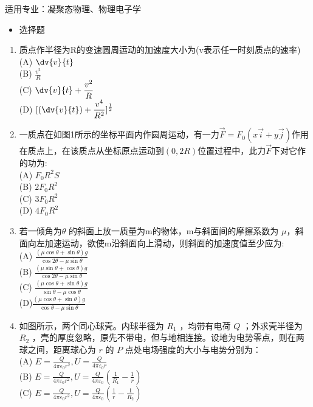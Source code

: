 适用专业：凝聚态物理、物理电子学
\begin{itemize}
\item 选择题
\end{itemize}
\begin{enumerate}
\item 质点作半径为R的变速圆周运动的加速度大小为(v表示任一时刻质点的速率)\\
(A) $\displaystyle \dv{v}{t}$\\
(B) $\displaystyle \frac{v^2}{R}$\\
(C) $\displaystyle \dv{v}{t}+\frac{v^2}{R}$\\
(D) $\displaystyle [(\dv{v}{t})+\frac{v^4}{R^2}]^\frac{1}{2}$
\item 一质点在如图1所示的坐标平面内作圆周运动，有一力$\vec F=F_0(x\vec i+y \vec j)$作用在质点上，在该质点从坐标原点运动到$(0,2R)$位置过程中，此力$\vec F$下对它作的功为:\\
(A) $F_0R^2S$\\
(B) $2F_0R^2$\\
(C) $3F_0R^2$\\
(D) $4F_0R^2$
\item 若一倾角为$\theta$ 的斜面上放一质量为m的物体，m与斜面间的摩擦系数为 $\mu$，斜面向左加速运动，欲使m沿斜面向上滑动，则斜面的加速度值至少应为:\\
(A) $\displaystyle \frac{(\mu \cos \theta+\sin \theta)g}{\cos 2\theta -\mu \sin \theta}$\\
(B) $\displaystyle\frac{(\mu \sin \theta+\cos \theta)g}{\cos 2\theta -\mu \sin \theta}$\\
(C) $\displaystyle \frac{(\mu \cos \theta+\sin \theta)g}{\sin \theta -\mu \cos\theta}$\\
(D)$\displaystyle \frac{(\mu \cos \theta+\sin \theta)g}{\cos \theta -\mu \sin\theta}$
\item 如图所示，两个同心球壳。内球半径为 $R_1$ ，均带有电荷 $Q$ ；外求壳半径为 $R_2$ ，壳的厚度忽略，原先不带电，但与地相连接。设地为电势零点，则在两球之间，距离球心为 $r$ 的 $P$ 点处电场强度的大小与电势分别为：\\
(A) $\displaystyle E=\frac{Q}{4\pi\varepsilon_0 r^2},U=\frac{Q}{4\pi\varepsilon_0 r}$\\
(B) $\displaystyle E=\frac{Q}{4\pi\varepsilon_0 r^2},U=\frac{Q}{4\pi\varepsilon_0} (\frac{1}{R_1}-\frac{1}{r})$\\
(C) $\displaystyle E=\frac{Q}{4\pi\varepsilon_0 r^2},U=\frac{Q}{4\pi\varepsilon_0} (\frac{1}{r}-\frac{1}{R_2}) $\\

\end{enumerate}
